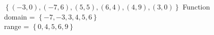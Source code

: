 {$\left\{ (-3,0), (-7,6), (5,5), (6,4), (4,9), (3,0) \right\}$}
{Function \\ domain = $\left\{ -7, -3, 3, 4, 5, 6 \right\}$ \\ range = $\left\{ 0,4,5,6,9 \right\}$}